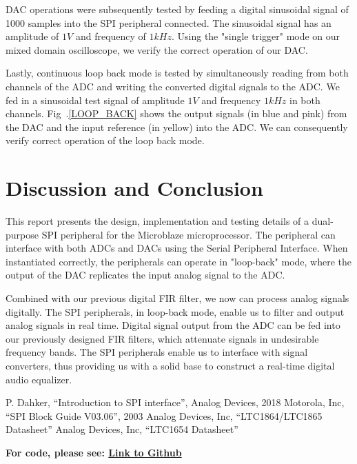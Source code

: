 \documentclass[conference]{IEEEtran}
\begin{document}
DAC operations were subsequently tested by feeding a digital sinusoidal signal of 1000 samples into the SPI peripheral connected. The sinusoidal signal has an amplitude of $1V$ and frequency of $1kHz$. Using the "single trigger" mode on our mixed domain oscilloscope, we verify the correct operation of our DAC.

Lastly, continuous loop back mode is tested by simultaneously reading from both channels of the ADC and writing the converted digital signals to the ADC. We fed in a sinusoidal test signal of amplitude $1V$ and frequency $1kHz$ in both channels. Fig~.\ref{LOOP_BACK} shows the output signals (in blue and pink) from the DAC and the input reference (in yellow) into the ADC. We can consequently verify correct operation of the loop back mode.


\section{Discussion and Conclusion} \label{discussion}
This report presents the design, implementation and testing details of a dual-purpose SPI peripheral for the Microblaze\textregistered{} microprocessor. The peripheral can interface with both ADCs and DACs using the Serial Peripheral Interface. When instantiated correctly, the peripherals can operate in "loop-back" mode, where the output of the DAC replicates the input analog signal to the ADC. 

Combined with our previous digital FIR filter, we now can process analog signals digitally. The SPI peripherals, in loop-back mode, enable us to filter and output analog signals in real time. Digital signal output from the ADC can be fed into our previously designed FIR filters, which attenuate signals in undesirable frequency bands. The SPI peripherals enable us to interface with signal converters, thus providing us with a solid base to construct a real-time digital audio equalizer.

\begin{thebibliography}{00}
 P. Dahker, ``Introduction to SPI interface'', Analog Devices, 2018
 Motorola, Inc, ``SPI Block Guide V03.06'', 2003
 Analog Devices, Inc, ``LTC1864/LTC1865 Datasheet''
 Analog Devices, Inc, ``LTC1654 Datasheet''
\end{thebibliography}

\textbf{For code, please see: \href{https://github.com/WillWu88/FPGA_Project_Reports/tree/main/Code/SPI}{Link to Github}}
\end{document}
